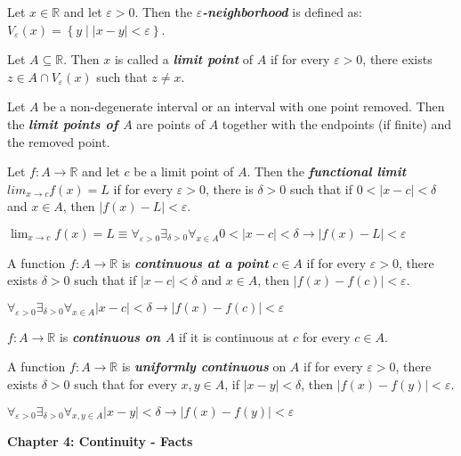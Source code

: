 \documentclass[12pt]{article}
\newcommand{\RR}{\mathbb{R}} %
\newcommand\set[1]{\left\lbrace #1 \right\rbrace} %
\newcommand\abs[1]{\left| #1 \right|} %
\newcommand{\eps}{\varepsilon}
\newcommand\defword[1]{\textit{\textbf{#1}}}
\begin{document}
\hrulefill

Let $x \in \RR$ and let $\eps > 0$. Then the \defword{$\eps$-neighborhood} is defined as:
\\
$V_{\eps}(x) = \set{y \mid \abs{x - y} < \eps}$.

\hrulefill

Let $A \subseteq \RR$. Then $x$ is called a \defword{limit point} of $A$ if for every $\eps > 0$, there exists $z \in A \cap V_{\eps}(x)$ such that $z \ne x$.

\hrulefill

Let $A$ be a non-degenerate interval or an interval with one point removed. Then the \defword{limit points of $A$} are points of $A$ together with the endpoints (if finite) and the removed point.

\hrulefill

Let $f : A \rightarrow \RR$ and let $c$ be a limit point of $A$. Then the \defword{functional limit} $lim_{x \rightarrow c} f(x) = L$ if for every $\eps > 0$, there is $\delta > 0$ such that if $0 < \abs{x - c} < \delta$ and $x \in A$, then $\abs{f(x) - L} < \eps$.

$\lim_{x \rightarrow c} f(x) = L \equiv \forall_{\eps > 0} \exists_{\delta > 0} \forall_{x \in A} 0 < \abs{x - c} < \delta \rightarrow \abs{f(x) - L} < \eps$

\hrulefill

A function $f : A \rightarrow \RR$ is \defword{continuous at a point} $c \in A$ if for every $\eps > 0$, there exists $\delta > 0$ such that if $\abs{x - c} < \delta$ and $x \in A$, then $\abs{f(x) - f(c)} < \eps$.

$\forall_{\eps > 0} \exists_{\delta > 0} \forall_{x \in A} \abs{x - c} < \delta \rightarrow \abs{f(x) - f(c)} < \eps$

\hrulefill

$f : A \rightarrow \RR$ is \defword{continuous on $A$} if it is continuous at $c$ for every $c \in A$.

\hrulefill

A function $f : A \rightarrow \RR$ is \defword{uniformly continuous} on $A$ if for every $\eps > 0$, there exists $\delta > 0$ such that for every $x, y \in A$, if $\abs{x - y} < \delta$, then $\abs{f(x) - f(y)} < \eps$.

$\forall_{\eps > 0} \exists_{\delta > 0} \forall_{x, y \in A} \abs{x - y} < \delta \rightarrow \abs{f(x) - f(y)} < \eps$

\pagebreak

\textbf{Chapter 4: Continuity - Facts}
\end{document}
